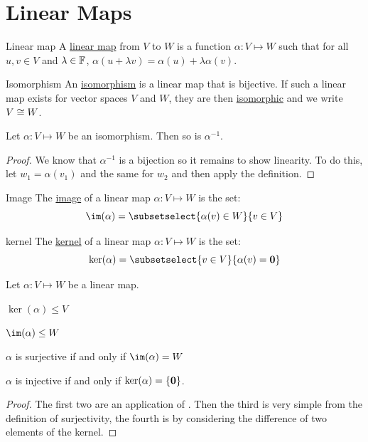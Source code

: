 \documentclass[../Main.tex]{subfiles}
\begin{document}
\section{Linear Maps}
\begin{definition}{Linear map}
    A \underline{linear map} from $V$ to $W$ is a function $\alpha : V \mapsto W$ such that for all $u, v \in V$ and $\lambda \in \mathbb{F}$, $\alpha(u + \lambda v) = \alpha(u) + \lambda \alpha(v)$.
\end{definition}
\begin{definition}{Isomorphism}
    An \underline{isomorphism} is a linear map that is bijective. If such a linear map exists for vector spaces $V$ and $W$, they are then \underline{isomorphic} and we write $V \cong W$.
\end{definition}
\begin{proposition}
    Let $\alpha : V \mapsto W$ be an isomorphism. Then so is $\alpha^{-1}$.
    \label{propIsomInvertible}
\end{proposition}
\begin{proof}
    We know that $\alpha^{-1}$ is a bijection so it remains to show linearity. To do this, let $w_1 = \alpha(v_1)$ and the same for $w_2$ and then apply the definition.
\end{proof}
\begin{definition}{Image}
    The \underline{image} of a linear map $\alpha : V \mapsto W$ is the set:
    \begin{equation*}
        \im(\alpha) = \subsetselect{\alpha(v) \in W}{v \in V}
    \end{equation*}
\end{definition}
\begin{definition}{kernel}
    The \underline{kernel} of a linear map $\alpha : V \mapsto W$ is the set:
    \begin{equation*}
        \ker(\alpha) = \subsetselect{v \in V}{\alpha(v) = \zv}
    \end{equation*}
\end{definition}
\begin{propositions}{
        Let $\alpha : V \mapsto W$ be a linear map.
        \label{propsImageKernel}
    }
    \item $\ker(\alpha) \leq V$
    \item $\im(\alpha) \leq W$
    \item $\alpha$ is surjective if and only if $\im(\alpha) = W$
    \item $\alpha$ is injective if and only if $\ker(\alpha) = \{\boldsymbol{0}\}$.
\end{propositions}
\begin{proof}
    The first two are an application of . Then the third is very simple from the definition of surjectivity, the fourth is by considering the difference of two elements of the kernel.
\end{proof}
\end{document}
